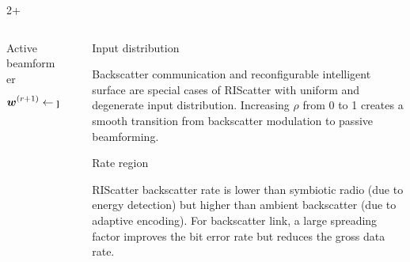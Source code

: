 \documentclass[final,xcolor={table}]{beamer}
\newlength{\sepwidth}
\newlength{\colwidth}
\newcommand{\separatorcolumn}{\begin{column}{\sepwidth}\end{column}}
\begin{document}
\begin{frame}[t]
\begin{columns}[t]
\begin{column}{2\colwidth+\sepwidth}
\begin{columns}[t,totalwidth=\textwidth]
\begin{column}{\colwidth}
					\begin{thm}{Active beamformer}{}
						\begin{equation*}
							\boldsymbol{w}^{(r+1)} \gets \mathrm{proj}_{\lVert \boldsymbol{w} \rVert^2 \le P}\Bigl(\boldsymbol{w}^{(r)}+\gamma\nabla_{\boldsymbol{w}^*} R^{(r)}\Bigr),
							\label{eq:beamforming_gradient_ascent}
						\end{equation*}
					\end{thm}
				\end{column}

				\separatorcolumn
				\begin{column}{\colwidth}
					\begin{exampleblock}{Input distribution}
						\begin{figure}[!t]
							\centering
							\subfloat{
								\resizebox{0.48\linewidth}{!}{
									
								}
							}
							\subfloat{
								\resizebox{0.48\linewidth}{!}{
									
								}
							}
						\end{figure}
						Backscatter communication and reconfigurable intelligent surface are special cases of RIScatter with uniform and degenerate input distribution.
						Increasing $\rho$ from 0 to 1 creates a smooth transition from backscatter modulation to passive beamforming.
					\end{exampleblock}
					\begin{exampleblock}{Rate region}
						\begin{figure}[!t]
							\centering
							\subfloat{
								\resizebox{0.48\linewidth}{!}{
									
								}
							}
							\subfloat{
								\resizebox{0.48\linewidth}{!}{
									
								}
							}
						\end{figure}
						RIScatter backscatter rate is lower than symbiotic radio (due to energy detection) but higher than ambient backscatter (due to adaptive encoding).
						For backscatter link, a large spreading factor improves the bit error rate but reduces the gross data rate.
					\end{exampleblock}


\end{column}
\end{columns}
\end{column}
\end{columns}
\end{frame}
\end{document}
